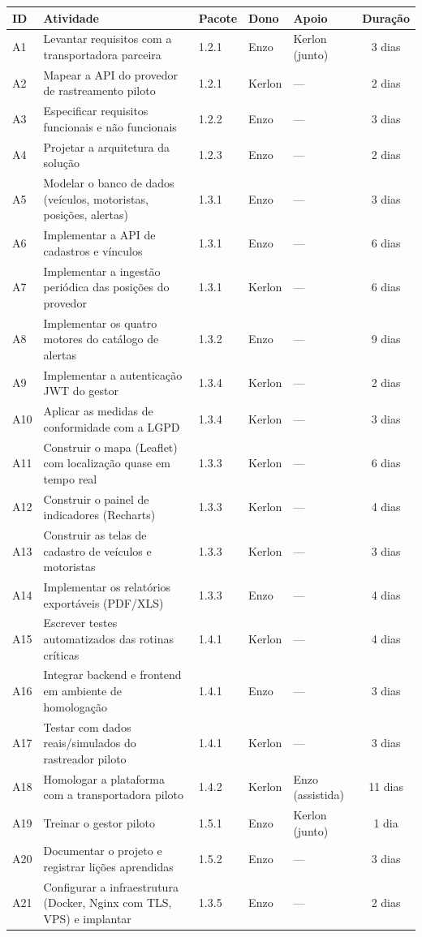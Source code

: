 \documentclass[11pt,a4paper]{article}
\begin{document}
\begin{center}
\footnotesize
\begin{tabularx}{\textwidth}{l L l l l c}
\toprule
\textbf{ID} & \textbf{Atividade} & \textbf{Pacote} & \textbf{Dono} & \textbf{Apoio} & \textbf{Duração} \\
\midrule
A1  & Levantar requisitos com a transportadora parceira & 1.2.1 & Enzo   & Kerlon (junto) & 3 dias \\
A2  & Mapear a API do provedor de rastreamento piloto & 1.2.1 & Kerlon & --- & 2 dias \\
A3  & Especificar requisitos funcionais e não funcionais & 1.2.2 & Enzo   & --- & 3 dias \\
A4  & Projetar a arquitetura da solução & 1.2.3 & Enzo   & --- & 2 dias \\
A5  & Modelar o banco de dados (veículos, motoristas, posições, alertas) & 1.3.1 & Enzo   & --- & 3 dias \\
A6  & Implementar a API de cadastros e vínculos & 1.3.1 & Enzo   & --- & 6 dias \\
A7  & Implementar a ingestão periódica das posições do provedor & 1.3.1 & Kerlon & --- & 6 dias \\
A8  & Implementar os quatro motores do catálogo de alertas & 1.3.2 & Enzo   & --- & 9 dias \\
A9  & Implementar a autenticação JWT do gestor & 1.3.4 & Kerlon & --- & 2 dias \\
A10 & Aplicar as medidas de conformidade com a LGPD & 1.3.4 & Kerlon & --- & 3 dias \\
A11 & Construir o mapa (Leaflet) com localização quase em tempo real & 1.3.3 & Kerlon & --- & 6 dias \\
A12 & Construir o painel de indicadores (Recharts) & 1.3.3 & Kerlon & --- & 4 dias \\
A13 & Construir as telas de cadastro de veículos e motoristas & 1.3.3 & Kerlon & --- & 3 dias \\
A14 & Implementar os relatórios exportáveis (PDF/XLS) & 1.3.3 & Enzo   & --- & 4 dias \\
A15 & Escrever testes automatizados das rotinas críticas & 1.4.1 & Kerlon & --- & 4 dias \\
A16 & Integrar backend e frontend em ambiente de homologação & 1.4.1 & Enzo   & --- & 3 dias \\
A17 & Testar com dados reais/simulados do rastreador piloto & 1.4.1 & Kerlon & --- & 3 dias \\
A18 & Homologar a plataforma com a transportadora piloto & 1.4.2 & Kerlon & Enzo (assistida) & 11 dias \\
A19 & Treinar o gestor piloto & 1.5.1 & Enzo   & Kerlon (junto) & 1 dia \\
A20 & Documentar o projeto e registrar lições aprendidas & 1.5.2 & Enzo   & --- & 3 dias \\
A21 & Configurar a infraestrutura (Docker, Nginx com TLS, VPS) e implantar & 1.3.5 & Enzo   & --- & 2 dias \\
\bottomrule
\end{tabularx}
\end{center}
\end{document}
